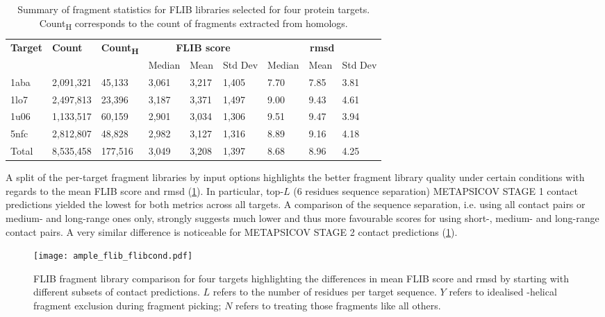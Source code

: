 \begin{table}[H]
  \centering
  \scriptsize
  \caption[FLIB fragment characterics across four protein targets]{Summary of fragment statistics for FLIB libraries selected for four protein targets. Count\textsubscript{H} corresponds to the count of fragments extracted from homologs.}
  \label{table:ample_flib_frag_summary}
  \begin{tabularx}{\textwidth}{X X X X X X X X X}
      \hline
      \multirow{2}{*}{\textbf{Target}} & \multirow{2}{*}{\textbf{Count}} & \multirow{2}{*}{\textbf{Count\textsubscript{H}}} & \multicolumn{3}{c}{\textbf{FLIB score}} & \multicolumn{3}{c}{\textbf{\gls{rmsd}}} \\ \cline{4-9}
      		&			&			& Median 	& Mean 		& Std Dev 	& Median 	& Mean 	& Std Dev \\
      \hline
      1aba	& 2,091,321	& 45,133		& 3,061	& 3,217	& 1,405	& 7.70	& 7.85	& 3.81	\\
	  1lo7	& 2,497,813	& 23,396		& 3,187	& 3,371	& 1,497	& 9.00	& 9.43	& 4.61	\\
      1u06	& 1,133,517	& 60,159		& 2,901	& 3,034	& 1,306	& 9.51	& 9.47	& 3.94	\\
      5nfc	& 2,812,807	& 48,828		& 2,982	& 3,127	& 1,316	& 8.89	& 9.16	& 4.18	\\
      \hline
      Total	& 8,535,458	& 177,516		& 3,049	& 3,208	& 1,397	& 8.68	& 8.96	& 4.25	\\
      \hline
  \end{tabularx}
\end{table}

A split of the per-target fragment libraries by input options highlights the better fragment library quality under certain conditions with regards to the mean FLIB score and \gls{rmsd} (\cref{fig:ample_flib_flibcond}). In particular, top-$L$ (6 residues sequence separation) METAPSICOV STAGE 1 contact predictions yielded the lowest for both metrics across all targets. A comparison of the sequence separation, i.e. using all contact pairs or medium- and long-range ones only, strongly suggests much lower and thus more favourable scores for using short-, medium- and long-range contact pairs. A very similar difference is noticeable for METAPSICOV STAGE 2 contact predictions (\cref{fig:ample_flib_flibcond}). 

\begin{figure}[H]
	\centering
	\texttt{[image: ample\_flib\_flibcond.pdf]}
	\caption[FLIB fragment library comparison]{FLIB fragment library comparison for four targets highlighting the differences in mean FLIB score and \gls{rmsd} by starting with different subsets of contact predictions. $L$ refers to the number of residues per target sequence. $Y$ refers to idealised \textalpha-helical fragment exclusion during fragment picking; $N$ refers to treating those fragments like all others.}
	\label{fig:ample_flib_flibcond}
\end{figure}

